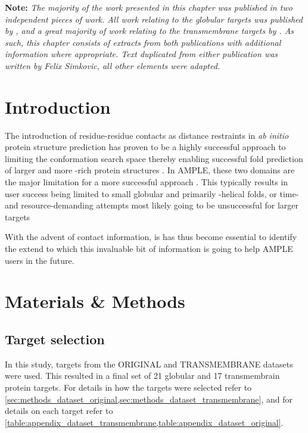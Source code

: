 \textbf{Note: }\textit{The majority of the work presented in this chapter was published in two independent pieces of work. All work relating to the globular targets was published by \textcite{Simkovic2016-wk}, and a great majority of work relating to the transmembrane targets by \textcite{Thomas2017-sh}. As such, this chapter consists of extracts from both publications with additional information where appropriate. Text duplicated from either publication was written by Felix Simkovic, all other elements were adapted.}

\section{Introduction}
The introduction of residue-residue contacts as distance restraints in \textit{ab initio} protein structure prediction has proven to be a highly successful approach to limiting the conformation search space thereby enabling successful fold prediction of larger and more \textbeta-rich protein structures \cite[e.g.,][]{Marks2011-os,Michel2014-eg,Kosciolek2014-bt,Ovchinnikov2015-tn,Ovchinnikov2016-jj,Michel2017-xh,De_Oliveira2017-sg,Ovchinnikov2017-nd,Wang2017-rx}. In AMPLE, these two domains are the major limitation for a more successful approach \cite{Bibby2012-lm}. This typically results in user success being limited to small globular and primarily \textalpha-helical folds, or time- and resource-demanding attempts most likely going to be unsuccessful for larger targets

With the advent of contact information, is has thus become essential to identify the extend to which this invaluable bit of information is going to help AMPLE users in the future.

\section{Materials \& Methods}
\subsection{Target selection}
In this study, targets from the ORIGINAL and TRANSMEMBRANE datasets were used. This resulted in a final set of 21 globular and 17 transmembrain protein targets. For details in how the targets were selected refer to \cref{sec:methods_dataset_original,sec:methods_dataset_transmembrane}, and for details on each target refer to \cref{table:appendix_dataset_transmembrane,table:appendix_dataset_original}.

